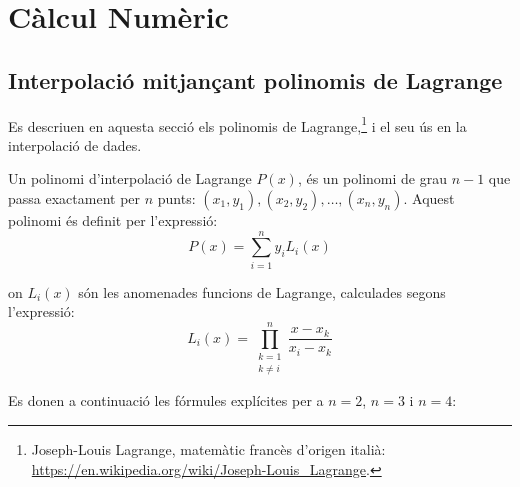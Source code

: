 
\chapter{Càlcul Numèric}\label{sec:ch-calc-num}

\section{Interpolació mitjançant polinomis de Lagrange}
\label{sec:poli_lagr}

Es descriuen en aquesta secció els polinomis de Lagrange,\footnote{Joseph-Louis Lagrange, matemàtic francès d'origen italià: \href{https://en.wikipedia.org/wiki/Joseph-Louis_Lagrange}{https:/\!\!/en.wikipedia.org/wiki/Joseph-Louis\_Lagrange}.} i el seu ús en la interpolació de dades.

Un polinomi d'interpolació de Lagrange $P(x)$, és un polinomi de grau $n-1$ que passa exactament per $n$ punts:
$(x_1, y_1), (x_2, y_2), \dots, (x_n, y_n)$. Aquest polinomi és definit per l'expressió:
\begin{equation}
  P(x) = \sum_{i=1}^{n}  y_i L_i(x) \label{eq:poly_lag_1}
\end{equation}

on $L_i(x)$ són les anomenades funcions de Lagrange, calculades segons l'expressió:
\begin{equation}
  L_i(x) = \prod_{\substack{k=1 \\ k\neq i}}^{n} \frac{x-x_k}{x_i-x_k} \label{eq:poly_lag_2}
\end{equation}

Es donen a continuació les fórmules explícites per a $n = 2$, $n=3$ i $n=4$:


